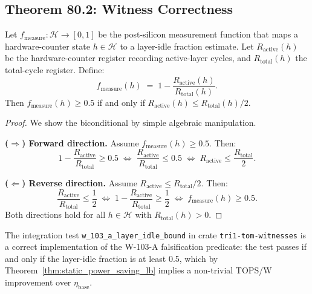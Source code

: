 \subsection{Theorem 80.2: Witness Correctness}

\begin{theorem}
\label{thm:witness_correctness}
Let \(f_{\mathrm{measure}} : \mathcal{H} \to [0,1]\) be the post-silicon
measurement function that maps a hardware-counter state
\(h \in \mathcal{H}\) to a layer-idle fraction estimate.  Let
\(R_{\mathrm{active}}(h)\) be the hardware-counter register
recording active-layer cycles, and \(R_{\mathrm{total}}(h)\) the
total-cycle register.  Define:
\[
  f_{\mathrm{measure}}(h) \;=\; 1 - \frac{R_{\mathrm{active}}(h)}{R_{\mathrm{total}}(h)}.
\]
Then \(f_{\mathrm{measure}}(h) \geq 0.5\) if and only if
\(R_{\mathrm{active}}(h) \leq R_{\mathrm{total}}(h) / 2\).
\end{theorem}

\begin{proof}
We show the biconditional by simple algebraic manipulation.

\medskip
\noindent\textbf{(\(\Rightarrow\)) Forward direction.}
Assume \(f_{\mathrm{measure}}(h) \geq 0.5\).  Then:
\[
  1 - \frac{R_{\mathrm{active}}}{R_{\mathrm{total}}} \geq 0.5
  \;\Longleftrightarrow\;
  \frac{R_{\mathrm{active}}}{R_{\mathrm{total}}} \leq 0.5
  \;\Longleftrightarrow\;
  R_{\mathrm{active}} \leq \frac{R_{\mathrm{total}}}{2}.
\]

\medskip
\noindent\textbf{(\(\Leftarrow\)) Reverse direction.}
Assume \(R_{\mathrm{active}} \leq R_{\mathrm{total}} / 2\).  Then:
\[
  \frac{R_{\mathrm{active}}}{R_{\mathrm{total}}} \leq \frac{1}{2}
  \;\Longleftrightarrow\;
  1 - \frac{R_{\mathrm{active}}}{R_{\mathrm{total}}} \geq \frac{1}{2}
  \;\Longleftrightarrow\;
  f_{\mathrm{measure}}(h) \geq 0.5.
\]
Both directions hold for all \(h \in \mathcal{H}\) with
\(R_{\mathrm{total}}(h) > 0\).
\end{proof}

\begin{corollary}
\label{cor:hw_counter}
The integration test \texttt{w\_103\_a\_layer\_idle\_bound} in crate
\texttt{tri1-tom-witnesses} is a correct implementation of the
W-103-A falsification predicate: the test passes if and only if the
layer-idle fraction is at least 0.5, which by
Theorem~\ref{thm:static_power_saving_lb} implies a non-trivial
TOPS/W improvement over \(\eta_{\mathrm{base}}\).
\end{corollary}


